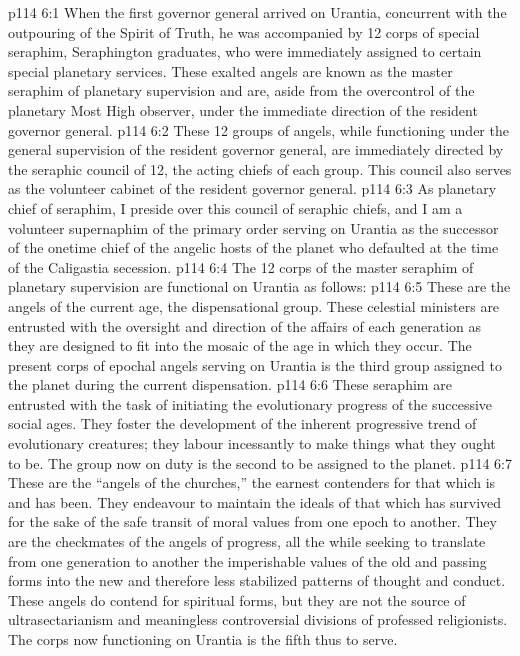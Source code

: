 \vs p114 6:1 When the first governor general arrived on Urantia, concurrent with the outpouring of the Spirit of Truth, he was accompanied by 12 corps of special seraphim, Seraphington graduates, who were immediately assigned to certain special planetary services. These exalted angels are known as the master seraphim of planetary supervision and are, aside from the overcontrol of the planetary Most High observer, under the immediate direction of the resident governor general.
\vs p114 6:2 These 12 groups of angels, while functioning under the general supervision of the resident governor general, are immediately directed by the seraphic council of 12, the acting chiefs of each group. This council also serves as the volunteer cabinet of the resident governor general.
\vs p114 6:3 As planetary chief of seraphim, I preside over this council of seraphic chiefs, and I am a volunteer supernaphim of the primary order serving on Urantia as the successor of the onetime chief of the angelic hosts of the planet who defaulted at the time of the Caligastia secession.
\vs p114 6:4 The 12 corps of the master seraphim of planetary supervision are functional on Urantia as follows:
\vs p114 6:5 \bibnobreakspace {} These are the angels of the current age, the dispensational group. These celestial ministers are entrusted with the oversight and direction of the affairs of each generation as they are designed to fit into the mosaic of the age in which they occur. The present corps of epochal angels serving on Urantia is the third group assigned to the planet during the current dispensation.
\vs p114 6:6 \bibnobreakspace {} These seraphim are entrusted with the task of initiating the evolutionary progress of the successive social ages. They foster the development of the inherent progressive trend of evolutionary creatures; they labour incessantly to make things what they ought to be. The group now on duty is the second to be assigned to the planet.
\vs p114 6:7 \bibnobreakspace {} These are the “angels of the churches,” the earnest contenders for that which is and has been. They endeavour to maintain the ideals of that which has survived for the sake of the safe transit of moral values from one epoch to another. They are the checkmates of the angels of progress, all the while seeking to translate from one generation to another the imperishable values of the old and passing forms into the new and therefore less stabilized patterns of thought and conduct. These angels do contend for spiritual forms, but they are not the source of ultrasectarianism and meaningless controversial divisions of professed religionists. The corps now functioning on Urantia is the fifth thus to serve.
